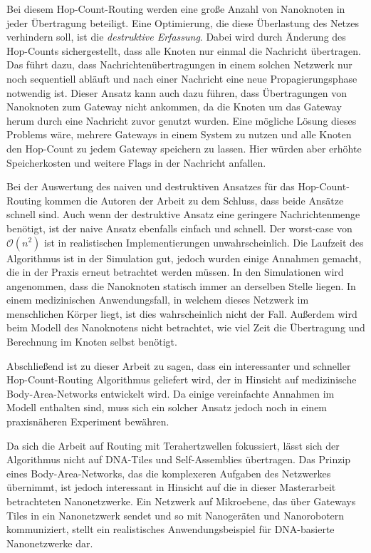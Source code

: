 Bei diesem Hop-Count-Routing werden eine große Anzahl von Nanoknoten in jeder Übertragung beteiligt. Eine Optimierung, die diese Überlastung des Netzes verhindern soll, ist die \emph{destruktive Erfassung}. Dabei wird durch Änderung des Hop-Counts sichergestellt, dass alle Knoten nur einmal die Nachricht übertragen. Das führt dazu, dass Nachrichtenübertragungen in einem solchen Netzwerk nur noch sequentiell abläuft und nach einer Nachricht eine neue Propagierungsphase notwendig ist. Dieser Ansatz kann auch dazu führen, dass Übertragungen von Nanoknoten zum Gateway nicht ankommen, da die Knoten um das Gateway herum durch eine Nachricht zuvor genutzt wurden. Eine mögliche Lösung dieses Problems wäre, mehrere Gateways in einem System zu nutzen und alle Knoten den Hop-Count zu jedem Gateway speichern zu lassen. Hier würden aber erhöhte Speicherkosten und weitere Flags in der Nachricht anfallen. 

Bei der Auswertung des naiven und destruktiven Ansatzes für das Hop-Count-Routing kommen die Autoren der Arbeit zu dem Schluss, dass beide Ansätze schnell sind. Auch wenn der destruktive Ansatz eine geringere Nachrichtenmenge benötigt, ist der naive Ansatz ebenfalls einfach und schnell. Der worst-case von $\mathcal{O}(n^2)$ ist in realistischen Implementierungen unwahrscheinlich. Die Laufzeit des Algorithmus ist in der Simulation gut, jedoch wurden einige Annahmen gemacht, die in der Praxis erneut betrachtet werden müssen. In den Simulationen wird angenommen, dass die Nanoknoten statisch immer an derselben Stelle liegen. In einem medizinischen Anwendungsfall, in welchem dieses Netzwerk im menschlichen Körper liegt, ist dies wahrscheinlich nicht der Fall. Außerdem wird beim Modell des Nanoknotens nicht betrachtet, wie viel Zeit die Übertragung und Berechnung im Knoten selbst benötigt.

Abschließend ist zu dieser Arbeit zu sagen, dass ein interessanter und schneller Hop-Count-Routing Algorithmus geliefert wird, der in Hinsicht auf medizinische Body-Area-Networks entwickelt wird. Da einige vereinfachte Annahmen im Modell enthalten sind, muss sich ein solcher Ansatz jedoch noch in einem praxisnäheren Experiment bewähren.

Da sich die Arbeit auf Routing mit Terahertzwellen fokussiert, lässt sich der Algorithmus nicht auf DNA-Tiles und Self-Assemblies übertragen. Das Prinzip eines Body-Area-Networks, das die komplexeren Aufgaben des Netzwerkes übernimmt, ist jedoch interessant in Hinsicht auf die in dieser Masterarbeit betrachteten Nanonetzwerke. Ein Netzwerk auf Mikroebene, das über Gateways Tiles in ein Nanonetzwerk sendet und so mit Nanogeräten und Nanorobotern kommuniziert, stellt ein realistisches Anwendungsbeispiel für DNA-basierte Nanonetzwerke dar.

